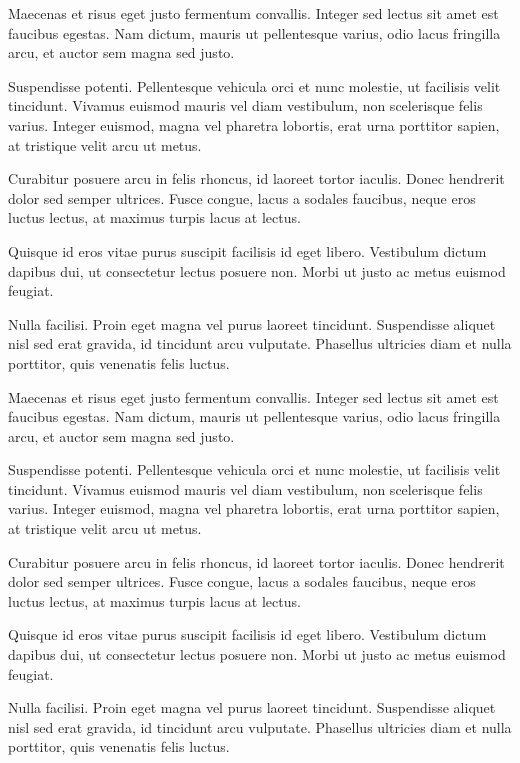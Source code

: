 Maecenas et risus eget justo fermentum convallis. Integer sed lectus sit amet est faucibus egestas. Nam dictum, mauris ut pellentesque varius, odio lacus fringilla arcu, et auctor sem magna sed justo.

Suspendisse potenti. Pellentesque vehicula orci et nunc molestie, ut facilisis velit tincidunt. Vivamus euismod mauris vel diam vestibulum, non scelerisque felis varius. Integer euismod, magna vel pharetra lobortis, erat urna porttitor sapien, at tristique velit arcu ut metus.

Curabitur posuere arcu in felis rhoncus, id laoreet tortor iaculis. Donec hendrerit dolor sed semper ultrices. Fusce congue, lacus a sodales faucibus, neque eros luctus lectus, at maximus turpis lacus at lectus.

Quisque id eros vitae purus suscipit facilisis id eget libero. Vestibulum dictum dapibus dui, ut consectetur lectus posuere non. Morbi ut justo ac metus euismod feugiat.

Nulla facilisi. Proin eget magna vel purus laoreet tincidunt. Suspendisse aliquet nisl sed erat gravida, id tincidunt arcu vulputate. Phasellus ultricies diam et nulla porttitor, quis venenatis felis luctus.

Maecenas et risus eget justo fermentum convallis. Integer sed lectus sit amet est faucibus egestas. Nam dictum, mauris ut pellentesque varius, odio lacus fringilla arcu, et auctor sem magna sed justo.

Suspendisse potenti. Pellentesque vehicula orci et nunc molestie, ut facilisis velit tincidunt. Vivamus euismod mauris vel diam vestibulum, non scelerisque felis varius. Integer euismod, magna vel pharetra lobortis, erat urna porttitor sapien, at tristique velit arcu ut metus.

Curabitur posuere arcu in felis rhoncus, id laoreet tortor iaculis. Donec hendrerit dolor sed semper ultrices. Fusce congue, lacus a sodales faucibus, neque eros luctus lectus, at maximus turpis lacus at lectus.

Quisque id eros vitae purus suscipit facilisis id eget libero. Vestibulum dictum dapibus dui, ut consectetur lectus posuere non. Morbi ut justo ac metus euismod feugiat.

Nulla facilisi. Proin eget magna vel purus laoreet tincidunt. Suspendisse aliquet nisl sed erat gravida, id tincidunt arcu vulputate. Phasellus ultricies diam et nulla porttitor, quis venenatis felis luctus.

\ifPDF
{}
\fi

